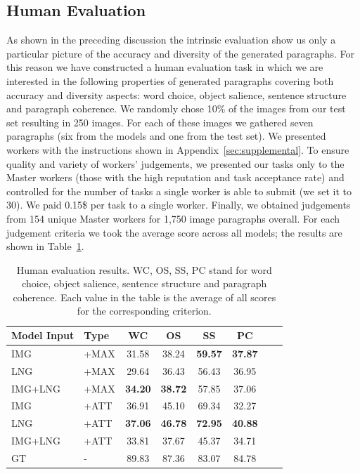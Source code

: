 \documentclass[11pt,a4paper]{article}
\begin{document}
\subsection{Human Evaluation}
\label{humaneval}
As shown in the preceding discussion the intrinsic evaluation show us only a particular picture of the accuracy and diversity of the generated paragraphs.
For this reason we have constructed a human evaluation task in which we are interested in the following properties of generated paragraphs covering both accuracy and diversity aspects: word choice, object salience, sentence structure and paragraph coherence.
We randomly chose 10\% of the images from our test set resulting in 250 images.
For each of these images we gathered seven paragraphs (six from the models and one from the test set).
We presented workers with the instructions shown in Appendix~\ref{sec:supplemental}.
To ensure quality and variety of workers' judgements, we presented our tasks only to the Master workers (those with the high reputation and task acceptance rate) and controlled for the number of tasks a single worker is able to submit (we set it to 30). %
We paid 0.15\$ per task to a single worker.
Finally, we obtained judgements from 154 unique Master workers for 1,750 image paragraphs overall.
For each judgement criteria we took the average score across all models; the results are shown in Table~\ref{tab:humeval}.

\begin{table}[h]
   \footnotesize
  \centering
  \begin{tabular}[width=\linewidth]{|l|l|c|c|c|c|c|c|}
  \hline
    \textbf{Model Input} & \textbf{Type} & \textbf{WC} & \textbf{OS} & \textbf{SS} & \textbf{PC}  \\
  \hline
   IMG & +MAX & 31.58 & 38.24 & \textbf{59.57} & \textbf{37.87}  \\
  \hline
   LNG & +MAX & 29.64 & 36.43 & 56.43 &  36.95 \\
  \hline
   IMG+LNG & +MAX & \textbf{34.20} & \textbf{38.72} & 57.85 & 37.06  \\
  \hline
  \hline
   IMG & +ATT & 36.91 & 45.10  & 69.34 & 32.27  \\
  \hline
   LNG & +ATT & \textbf{37.06} & \textbf{46.78} & \textbf{72.95} & \textbf{40.88}  \\
  \hline
   IMG+LNG & +ATT & 33.81 & 37.67 & 45.37 &  34.71 \\
  \hline
  \hline
  GT & - & 89.83 & 87.36 & 83.07 & 84.78  \\
  \hline
  \end{tabular}
  \caption{Human evaluation results. WC, OS, SS, PC stand for word choice, object salience, sentence structure and paragraph coherence. Each value in the table is the average of all scores for the corresponding criterion.}
  \label{tab:humeval}
\end{table}
\end{document}
